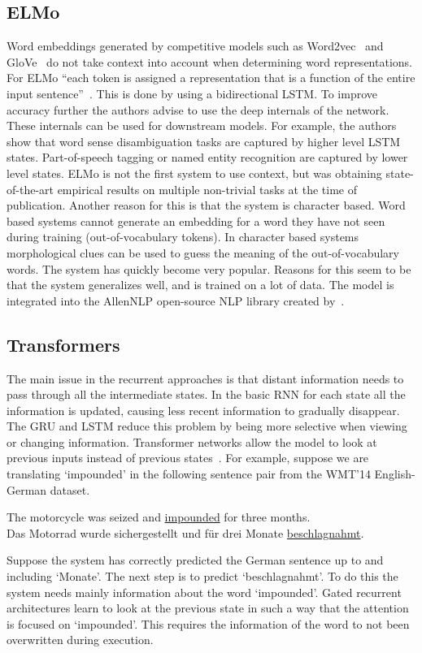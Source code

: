 \subsection{ELMo}
\label{subsec:elmo}
Word embeddings generated by competitive models such as Word2vec~\citep{mikolov2013distributed} and GloVe~\citep{pennington2014} do not take context into account when determining word representations.
For ELMo ``each token is assigned a representation that is a function of the entire input sentence''~\citep{peters2018}.
This is done by using a bidirectional LSTM.
To improve accuracy further the authors advise to use the deep internals of the network.
These internals can be used for downstream models.
For example, the authors show that word sense disambiguation tasks are captured by higher level LSTM states.
Part-of-speech tagging or named entity recognition are captured by lower level states.
ELMo is not the first system to use context, but was obtaining state-of-the-art empirical results on multiple non-trivial tasks at the time of publication.
Another reason for this is that the system is character based.
Word based systems cannot generate an embedding for a word they have not seen during training (out-of-vocabulary tokens).
In character based systems morphological clues can be used to guess the meaning of the out-of-vocabulary words.
The system has quickly become very popular.
Reasons for this seem to be that the system generalizes well, and is trained on a lot of data.
The model is integrated into the AllenNLP open-source NLP library created by~\citet{gardner2017}.

\subsection{Transformers}
\label{subsec:transformers}
The main issue in the recurrent approaches is that distant information needs to pass through all the intermediate states.
In the basic RNN for each state all the information is updated, causing less recent information to gradually disappear.
The GRU and LSTM reduce this problem by being more selective when viewing or changing information.
Transformer networks allow the model to look at previous inputs instead of previous states~\citet{vaswani2017attention}.
For example, suppose we are translating `impounded' in the following sentence pair from the WMT'14 English-German dataset.
\begin{center}
    The motorcycle was seized and \underline{impounded} for three months.\\[3mm]
    Das Motorrad wurde sichergestellt und f\"ur drei Monate \underline{beschlagnahmt}.
\end{center}
Suppose the system has correctly predicted the German sentence up to and including `Monate'.
The next step is to predict `beschlagnahmt'.
To do this the system needs mainly information about the word `impounded'.
Gated recurrent architectures learn to look at the previous state in such a way that the attention is focused on `impounded'.
This requires the information of the word to not been overwritten during execution.

